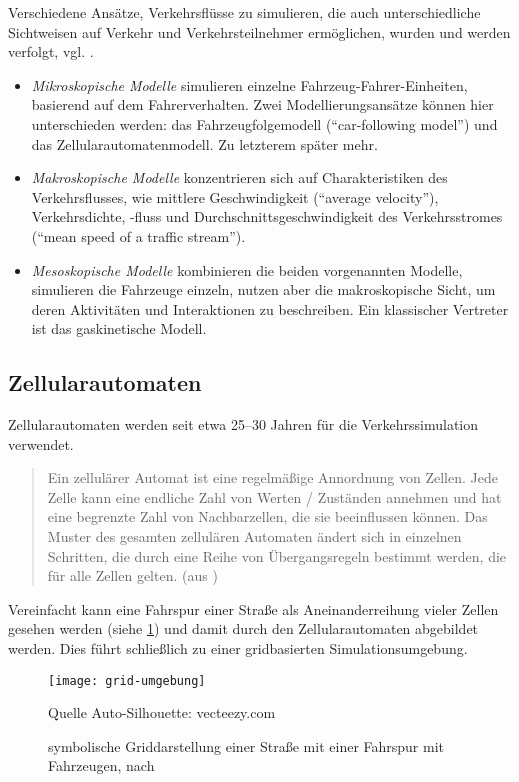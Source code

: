 Verschiedene Ansätze, Verkehrsflüsse zu simulieren, die auch unterschiedliche Sichtweisen auf Verkehr und Verkehrsteilnehmer ermöglichen, %
wurden und werden verfolgt, vgl. \cite{dingding}.
\begin{itemize}
	\item \textit{Mikroskopische Modelle} simulieren einzelne Fahrzeug-Fahrer-Einheiten, basierend auf dem Fahrerverhalten. Zwei Modellierungsansätze können hier unterschieden werden: das Fahrzeugfolgemodell (\enquote{car-following model}) und das Zellularautomatenmodell. Zu letzterem später mehr.
	\item \textit{Makroskopische Modelle}  konzentrieren sich auf Charakteristiken des Verkehrsflusses, wie mittlere Geschwindigkeit (\enquote{average velocity}), Verkehrsdichte, -fluss und Durchschnittsgeschwindigkeit des Verkehrsstromes (\enquote{mean speed of a traffic stream}).
	\item \textit{Mesoskopische Modelle} kombinieren die beiden vorgenannten Modelle, simulieren die Fahrzeuge einzeln, nutzen aber die makroskopische Sicht, um deren Aktivitäten und Interaktionen zu beschreiben. Ein klassischer Vertreter ist das gaskinetische Modell.
\end{itemize}






\subsection{Zellularautomaten}
\label{sec:ca}

Zellularautomaten werden seit etwa 25--30 Jahren für die Verkehrssimulation verwendet.

\begin{quote}
Ein zellulärer Automat ist eine regelmäßige Annordnung von Zellen. Jede Zelle kann eine endliche Zahl von Werten / Zuständen annehmen und hat eine  begrenzte Zahl von Nachbarzellen, die sie beeinflussen können. Das Muster des gesamten zellulären Automaten ändert sich in einzelnen Schritten, die durch eine Reihe von Übergangsregeln bestimmt werden, die für alle Zellen gelten. (aus \cite{cell-autom})
\end{quote} 

\noindent
Vereinfacht kann eine Fahrspur einer Straße als Aneinanderreihung vieler Zellen gesehen werden (siehe \cref{figure:grid-umgebung}) und damit durch den Zellularautomaten abgebildet werden. 
Dies führt schließlich zu einer gridbasierten Simulationsumgebung. 
\begin{figure}[hptb]
 \centering
 \texttt{[image: grid-umgebung]}
 \caption[Beispiel für die Griddarstellung einer Straße]
 		{symbolische Griddarstellung einer Straße mit einer Fahrspur mit Fahrzeugen, nach \cite{multi-lane}}
        {\footnotesize Quelle Auto-Silhouette: vecteezy.com}
 \label{figure:grid-umgebung}
\end{figure} 


